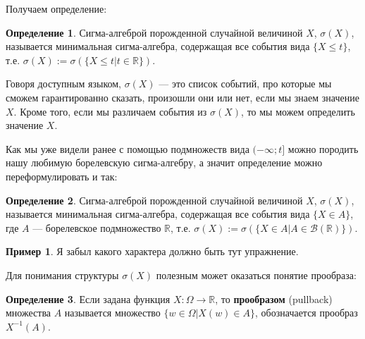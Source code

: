 \documentclass[pdftex, 12pt, a4paper]{article}
\def\R{\ensuremath{\mathbb{R}}} %
\def\s{\ensuremath{\sigma}}
\def \Om{\Omega}
\renewcommand{\to}{\rightarrow}
\renewcommand{\le}{\leqslant}
\theoremstyle{definition} %
\newtheorem*{mydef}{Определение}
\newtheorem{myex}{Пример}
\numberwithin{problem}{section}
\newcommand{\indef}[1]{\textbf{#1}}
\numberwithin{blits}{section}
\begin{document}
Получаем определение:

\begin{mydef}
Сигма-алгеброй порожденной случайной величиной $ X $, $ \sigma(X) $, называется минимальная сигма-алгебра, содержащая все события вида $ \{X \le t\} $, т.е. $ \sigma(X):=\sigma(\{X \le t|t\in \mathbb{R}\}) $.
\end{mydef}

Говоря доступным языком, $\s(X)$ --- это список событий, про которые мы сможем гарантированно сказать, произошли они или нет, если мы знаем значение $X$. Кроме того, если мы различаем события из $\s(X)$, то мы можем определить значение $X$.

Как мы уже видели ранее с помощью подмножеств вида $ (-\infty;t] $ можно породить нашу любимую борелевскую сигма-алгебру, а значит определение можно переформулировать и так:

\begin{mydef}
Сигма-алгеброй порожденной случайной величиной $ X $, $ \sigma(X) $, называется минимальная сигма-алгебра, содержащая все события вида $ \{X\in A\} $, где $ A $ --- борелевское подмножество $ \mathbb{R} $, т.е. $ \sigma(X):=\sigma(\{X\in A|A\in \mathcal{B}(\mathbb{R})\}) $. 
\end{mydef}


\begin{myex}
Я забыл какого характера должно быть тут упражнение. 
\end{myex}









Для понимания структуры $ \sigma(X) $ полезным может оказаться понятие прообраза:

\begin{mydef} Если задана функция $X:\Omega \to \R$, то \indef{прообразом} (pullback) множества $A$ называется множество $\{w\in\Omega|X(w)\in A\}$, обозначается прообраз $X^{-1}(A)$.
\end{mydef}
\end{document}

